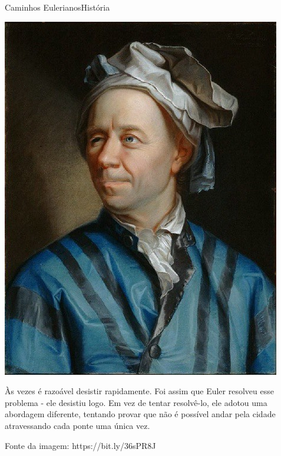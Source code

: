 \documentclass[t]{beamer}
\begin{document}

\begin{ftst}{Caminhos Eulerianos}{História}

\begin{minipage}{.5\textwidth}
    \vone
    \centering
    \includegraphics[scale=0.3]{Figuras/euler.jpeg}
\end{minipage}%
\hfill
\begin{minipage}{.5\textwidth}
    \justifying
    \footnotesize
    Às vezes é razoável desistir rapidamente. Foi assim que Euler resolveu esse problema - ele desistiu logo.
    \vone
    Em vez de tentar resolvê-lo, ele adotou uma abordagem diferente, tentando provar que não é possível andar pela cidade atravessando cada ponte uma única vez.
\end{minipage}
\vone
\tiny
Fonte da imagem: \hypertarget{clique aqui.}{https://bit.ly/36sPR8J}
\end{ftst}

\end{document}
